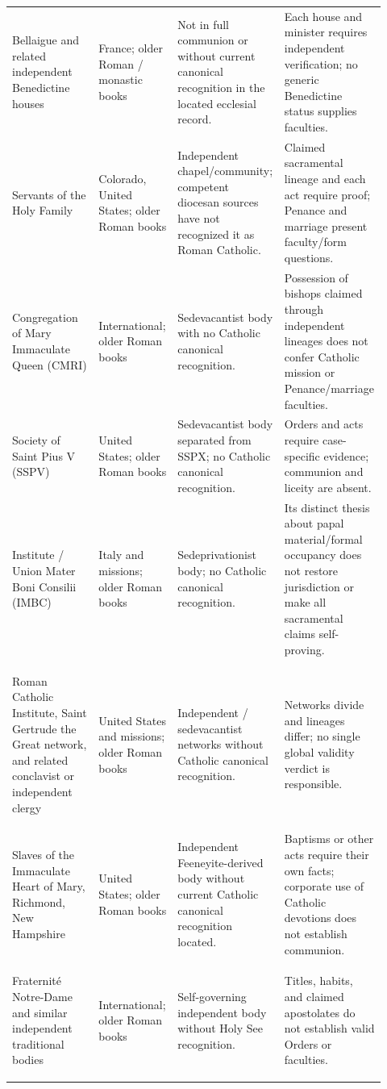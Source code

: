 \begin{longtable}{>{\bfseries\raggedright\arraybackslash}p{0.23\linewidth}>{\raggedright\arraybackslash}p{0.20\linewidth}>{\raggedright\arraybackslash}p{0.25\linewidth}>{\raggedright\arraybackslash}p{0.24\linewidth}}
Bellaigue and related independent Benedictine houses & France; older Roman / monastic books & Not in full communion or without current canonical recognition in the located ecclesial record. & Each house and minister requires independent verification; no generic Benedictine status supplies faculties.\\
Servants of the Holy Family & Colorado, United States; older Roman books & Independent chapel/community; competent diocesan sources have not recognized it as Roman Catholic. & Claimed sacramental lineage and each act require proof; Penance and marriage present faculty/form questions.\\
Congregation of Mary Immaculate Queen (CMRI) & International; older Roman books & Sedevacantist body with no Catholic canonical recognition. & Possession of bishops claimed through independent lineages does not confer Catholic mission or Penance/marriage faculties.\\
Society of Saint Pius V (SSPV) & United States; older Roman books & Sedevacantist body separated from SSPX; no Catholic canonical recognition. & Orders and acts require case-specific evidence; communion and liceity are absent.\\
Institute / Union Mater Boni Consilii (IMBC) & Italy and missions; older Roman books & Sedeprivationist body; no Catholic canonical recognition. & Its distinct thesis about papal material/formal occupancy does not restore jurisdiction or make all sacramental claims self-proving.\\
Roman Catholic Institute, Saint Gertrude the Great network, and related conclavist or independent clergy & United States and missions; older Roman books & Independent / sedevacantist networks without Catholic canonical recognition. & Networks divide and lineages differ; no single global validity verdict is responsible.\\
Slaves of the Immaculate Heart of Mary, Richmond, New Hampshire & United States; older Roman books & Independent Feeneyite-derived body without current Catholic canonical recognition located. & Baptisms or other acts require their own facts; corporate use of Catholic devotions does not establish communion.\\
Fraternité Notre-Dame and similar independent traditional bodies & International; older Roman books & Self-governing independent body without Holy See recognition. & Titles, habits, and claimed apostolates do not establish valid Orders or faculties.\\
\bottomrule
\end{longtable}

